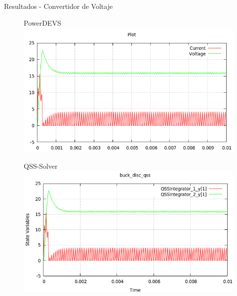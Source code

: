 \documentclass{beamer}
\begin{document}
\begin{frame}{Resultados - Convertidor de Voltaje}
\begin{figure}[H]
\begin{minipage}{0.5\textwidth}
\centering
PowerDEVS \\
 \includegraphics[width=\linewidth]{buck_disk-pd}
\end{minipage}\hfill
\begin{minipage}{0.5\textwidth}
\centering
QSS-Solver \\
 \includegraphics[width=\linewidth]{buck_disk-qss}
\end{minipage}
\end{figure}
\end{frame}
\end{document}
